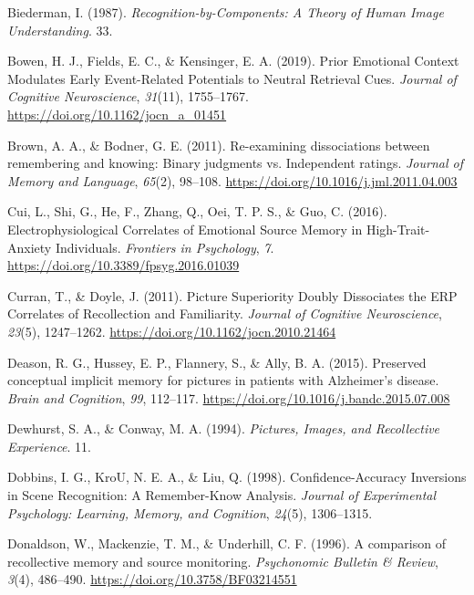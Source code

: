 \documentclass[
  11pt,
]{article}
\begin{document}
\leavevmode\hypertarget{ref-biederman1987}{}%
Biederman, I. (1987). \emph{Recognition-by-Components: A Theory of Human
Image Understanding}. 33.

\leavevmode\hypertarget{ref-bowen2019}{}%
Bowen, H. J., Fields, E. C., \& Kensinger, E. A. (2019). Prior Emotional
Context Modulates Early Event-Related Potentials to Neutral Retrieval
Cues. \emph{Journal of Cognitive Neuroscience}, \emph{31}(11),
1755--1767. \url{https://doi.org/10.1162/jocn_a_01451}

\leavevmode\hypertarget{ref-brown2011}{}%
Brown, A. A., \& Bodner, G. E. (2011). Re-examining dissociations
between remembering and knowing: Binary judgments vs. Independent
ratings. \emph{Journal of Memory and Language}, \emph{65}(2), 98--108.
\url{https://doi.org/10.1016/j.jml.2011.04.003}

\leavevmode\hypertarget{ref-cui2016}{}%
Cui, L., Shi, G., He, F., Zhang, Q., Oei, T. P. S., \& Guo, C. (2016).
Electrophysiological Correlates of Emotional Source Memory in
High-Trait-Anxiety Individuals. \emph{Frontiers in Psychology},
\emph{7}. \url{https://doi.org/10.3389/fpsyg.2016.01039}

\leavevmode\hypertarget{ref-curran2011}{}%
Curran, T., \& Doyle, J. (2011). Picture Superiority Doubly Dissociates
the ERP Correlates of Recollection and Familiarity. \emph{Journal of
Cognitive Neuroscience}, \emph{23}(5), 1247--1262.
\url{https://doi.org/10.1162/jocn.2010.21464}

\leavevmode\hypertarget{ref-deason2015}{}%
Deason, R. G., Hussey, E. P., Flannery, S., \& Ally, B. A. (2015).
Preserved conceptual implicit memory for pictures in patients with
Alzheimer's disease. \emph{Brain and Cognition}, \emph{99}, 112--117.
\url{https://doi.org/10.1016/j.bandc.2015.07.008}

\leavevmode\hypertarget{ref-dewhurst1994}{}%
Dewhurst, S. A., \& Conway, M. A. (1994). \emph{Pictures, Images, and
Recollective Experience}. 11.

\leavevmode\hypertarget{ref-dobbins1998}{}%
Dobbins, I. G., KroU, N. E. A., \& Liu, Q. (1998). Confidence-Accuracy
Inversions in Scene Recognition: A Remember-Know Analysis. \emph{Journal
of Experimental Psychology: Learning, Memory, and Cognition},
\emph{24}(5), 1306--1315.

\leavevmode\hypertarget{ref-donaldson1996}{}%
Donaldson, W., Mackenzie, T. M., \& Underhill, C. F. (1996). A
comparison of recollective memory and source monitoring.
\emph{Psychonomic Bulletin \& Review}, \emph{3}(4), 486--490.
\url{https://doi.org/10.3758/BF03214551}
\end{document}
